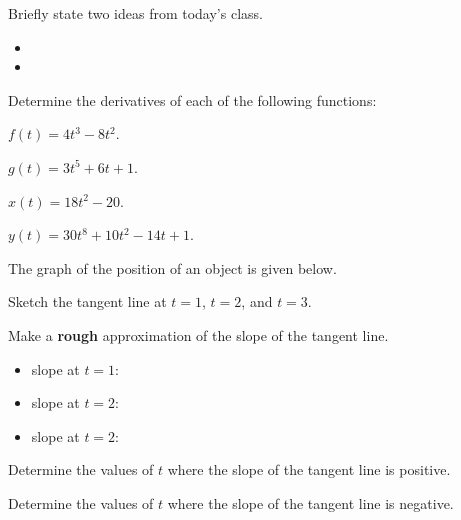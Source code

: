 \postClass

\begin{problem}
\item Briefly state two ideas from today's class.
  \begin{itemize}
  \item 
  \item 
  \end{itemize}
  \item Determine the derivatives of each of the following functions:
    \begin{subproblem}
    \item $f(t)=4t^3-8t^2$.
      \vfill
    \item $g(t)=3t^5+6t + 1$.
      \vfill
    \item $x(t)=18t^2-20$.
      \vfill
    \item $y(t)=30t^8+10t^2 - 14 t + 1$.
      \vfill
  \end{subproblem}

\end{problem}




\begin{problem}
\item The graph of the position of an object is given below.

  \scalebox{0.6}{}

  \begin{subproblem}
  \item Sketch the tangent line at $t=1$, $t=2$, and $t=3$.
  \item Make a \textbf{rough} approximation of the slope of the tangent line.
    \begin{itemize}
    \item slope at $t=1$:
    \item slope at $t=2$:
    \item slope at $t=2$:
    \end{itemize}
  \item Determine the values of $t$ where the slope of the tangent line is positive.
    \vfill
  \item Determine the values of $t$ where the slope of the tangent line is negative.
    \vfill
  \end{subproblem}

\end{problem}


